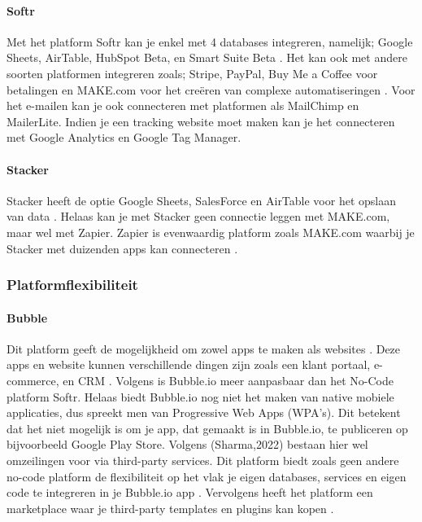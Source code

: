 \paragraph{Softr}
Met het platform Softr kan je enkel met 4 databases integreren, namelijk; Google Sheets, AirTable, HubSpot Beta, en Smart Suite Beta \autocite{Frater2024}. 
Het kan ook met andere soorten platformen integreren zoals; Stripe, PayPal, Buy Me a Coffee voor betalingen en MAKE.com voor het creëren van complexe automatiseringen \autocite{Code2023} \autocite{Youssef2023}. 
Voor het e-mailen kan je ook connecteren met platformen als MailChimp en MailerLite. Indien je een tracking website moet maken kan je het connecteren met Google Analytics en Google Tag Manager.
\paragraph{Stacker}
Stacker heeft de optie Google Sheets, SalesForce en AirTable voor het opslaan van data \autocite{Englert2021} \autocite{JDN2023} \autocite{Youssef2023}. 
Helaas kan je met Stacker geen connectie leggen met MAKE.com, maar wel met Zapier. 
Zapier is evenwaardig platform zoals MAKE.com waarbij je Stacker met duizenden apps kan connecteren \autocite{Zapier}.
\subsubsection*{Platformflexibiliteit}

\paragraph{Bubble}
Dit platform geeft de mogelijkheid om zowel apps te maken als websites \autocite{Youssef2023}. 
Deze apps en website kunnen verschillende dingen zijn zoals een klant portaal, e-commerce, en CRM \autocite{Sharma2022}. 
Volgens \textcite{Youssef2023} is Bubble.io meer aanpasbaar dan het No-Code platform Softr. Helaas biedt Bubble.io nog niet het maken van native mobiele applicaties, dus spreekt men van Progressive Web Apps (WPA’s). 
Dit betekent dat het niet mogelijk is om je app, dat gemaakt is in Bubble.io, te publiceren op bijvoorbeeld Google Play Store. Volgens (Sharma,2022) bestaan hier wel omzeilingen voor via third-party services. Dit platform biedt zoals geen andere no-code platform de flexibiliteit op het vlak je eigen databases, services en eigen code te integreren in je Bubble.io app \autocite{Bas2024}. 
Vervolgens heeft het platform een marketplace waar je third-party templates en plugins kan kopen \autocite{Sharma2022}. 
